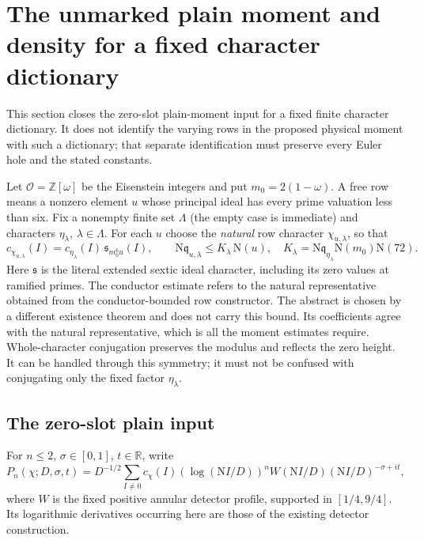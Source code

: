 \section{The unmarked plain moment and density for a fixed character dictionary}
\label{sec:actual-unmarked-density}

This section closes the zero-slot plain-moment input for a fixed finite
character dictionary. It does not identify the varying rows in the proposed
physical moment with such a dictionary; that separate identification must
preserve every Euler hole and the stated constants.

Let $\mathcal O=\mathbb Z[\omega]$ be the Eisenstein integers and put
$m_0=2(1-\omega)$. A free row means a nonzero element $u$ whose principal ideal
has every prime valuation less than six. Fix a nonempty finite set $\Lambda$ (the empty case is immediate) and
characters $\eta_\lambda$, $\lambda\in\Lambda$. For each $u$ choose the
\emph{natural} row character $\chi_{u,\lambda}$, so that
\[
 c_{\chi_{u,\lambda}}(I)
 =c_{\eta_\lambda}(I)\,\mathfrak s_{m_0^6u}(I),
 \qquad
 \mathrm N\mathfrak q_{u,\lambda}
 \le K_\lambda\,\mathrm N(u),
 \quad K_\lambda=\mathrm N\mathfrak q_{\eta_\lambda}
                   \mathrm N(m_0)\mathrm N(72).
\]
Here $\mathfrak s$ is the literal extended sextic ideal character, including
its zero values at ramified primes. The conductor estimate refers to the
natural representative obtained from the conductor-bounded row constructor.
The abstract  is chosen by a different existence
theorem and does not carry this bound. Its coefficients agree with the
natural representative, which is all the moment estimates require.
Whole-character conjugation preserves the modulus and reflects the zero
height. It can be handled through this symmetry; it must not be confused
with conjugating only the fixed factor $\eta_\lambda$.

\subsection{The zero-slot plain input}

For $n\le2$, $\sigma\in[0,1]$, $t\in\mathbb R$, write
\[
 P_n(\chi;D,\sigma,t)
 =D^{-1/2}\sum_{I\ne0}c_\chi(I)
   (\log(\mathrm NI/D))^n W(\mathrm NI/D)
   (\mathrm NI/D)^{-\sigma+it},
\]
where $W$ is the fixed positive annular detector profile, supported in
$[1/4,9/4]$. Its logarithmic derivatives occurring here are those of the
existing detector construction.

